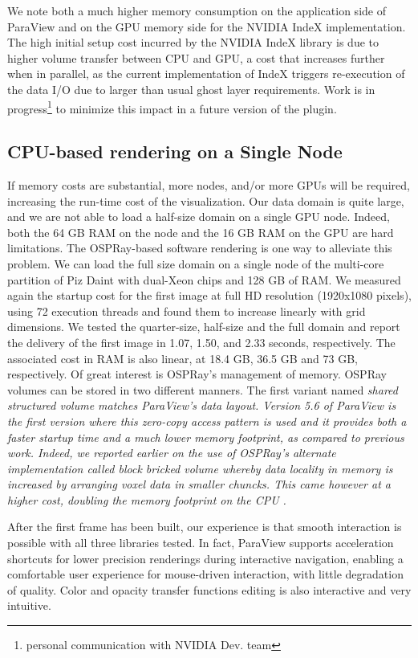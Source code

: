 \documentclass[5p,times]{elsarticle}
\begin{document}
We note both a much higher memory consumption on the application side of ParaView
and on the GPU memory side for the NVIDIA IndeX implementation. The high initial 
setup cost incurred by the NVIDIA IndeX library is due to higher volume transfer
between CPU and GPU, a cost that increases further when in parallel, as the current
implementation of IndeX triggers re-execution of the data I/O due to larger than
usual ghost layer requirements. Work is in progress\footnote{personal communication
with NVIDIA Dev. team} to minimize this impact in a future version of the plugin.
\subsection{CPU-based rendering on a Single Node}
If memory costs are substantial, more nodes, and/or more GPUs will be required,
increasing the run-time cost of the visualization. Our data domain is quite large, and we are not able to load a half-size domain on a single GPU node. Indeed, both
the 64 GB RAM on the node and the 16 GB RAM on the GPU are hard limitations.
The OSPRay-based software rendering is one way to alleviate this problem. We can load the full size
domain on a single node of the multi-core partition of Piz Daint with dual-Xeon
chips and 128 GB of RAM. We measured again the startup cost for the first image
at full HD resolution (1920x1080 pixels),
using 72 execution threads and found them to increase linearly with grid dimensions.
We tested the quarter-size, half-size and the full domain and report the delivery
of the first image in 1.07, 1.50, and 2.33 seconds, respectively. The associated cost
in RAM is also linear, at 18.4 GB, 36.5 GB and 73 GB, respectively. Of great interest
is OSPRay's management of memory. OSPRay volumes can be stored in two different manners.
The first variant named \it{shared structured volume} \rm matches ParaView's data layout.
Version 5.6 of ParaView is the first version where this zero-copy access pattern is used
and it provides both a faster startup time and a much lower memory footprint, as compared
to previous work. Indeed, we reported earlier on
the use of OSPRay's alternate implementation called \it{block bricked volume} \rm whereby
data locality in memory is increased by arranging voxel data in smaller chuncks. This came
however at a higher cost, doubling the memory footprint on the CPU \cite{SC18ThermalConvection}. 
 
After the first frame has been built, our experience is that smooth interaction
is possible with all three libraries tested. In fact, ParaView supports acceleration
shortcuts for lower precision renderings during interactive navigation,
enabling a comfortable user experience for mouse-driven interaction,
with little degradation of quality. 
Color and opacity transfer functions editing is also interactive and very intuitive.
\end{document}
